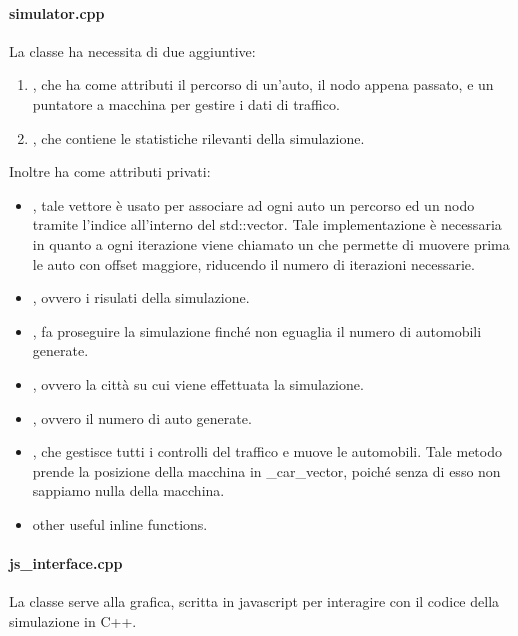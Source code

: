 \documentclass[main.tex]{subfiles}
\begin{document}
        \paragraph{simulator.cpp}
            La classe  ha necessita di due  aggiuntive:
            \begin{enumerate}
                \item {}, che ha come attributi il percorso di un'auto, il nodo appena passato, e un puntatore a macchina per gestire i dati di traffico.
                \item {}, che contiene le statistiche rilevanti della simulazione.
            \end{enumerate}
            Inoltre ha come attributi privati:
            \begin{itemize}
                \item {}, tale vettore è usato per associare ad ogni auto un percorso ed un nodo tramite l'indice 
                    all'interno del std::vector. Tale implementazione è necessaria in quanto a ogni iterazione viene chiamato un  che permette di 
                    muovere prima le auto con offset maggiore, riducendo il numero di iterazioni necessarie.
                \item {}, ovvero i risulati della simulazione.
                \item {}, fa proseguire la simulazione finché non eguaglia il numero di automobili generate.
                \item {}, ovvero la città su cui viene effettuata la simulazione.
                \item {}, ovvero il numero di auto generate.
                \item {}, che gestisce tutti i controlli del traffico e muove le automobili.
                    Tale metodo prende la posizione della macchina in \_car\_vector, poiché senza di esso non sappiamo nulla della macchina.
                \item other useful inline functions.
            \end{itemize}
        \paragraph{js\_interface.cpp} 
            La classe  serve alla grafica, scritta in javascript per interagire con il codice della simulazione in C++.
\end{document}
